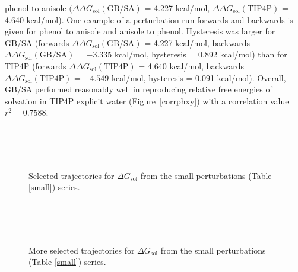 \documentclass[12pt]{report}
\def\figlab{Figure}\def\figslab{\figlab s}
\newcommand*\fig[1]{\figlab~\ref{#1}}
\begin{document}
phenol to anisole 
$(\Delta\Delta G_{ \textrm{sol}}(\textrm{GB/SA})$ = 4.227 kcal/mol, 
$\Delta\Delta G_{ \textrm{sol}}(\textrm{TIP4P})$ = 4.640 kcal/mol). 
One example of a perturbation run forwards and backwards is given for phenol to anisole and anisole to phenol. 
Hysteresis was larger for GB/SA (forwards 
$\Delta\Delta G_{ \textrm{sol}}(\textrm{GB/SA})$ = 4.227 kcal/mol, backwards 
$\Delta\Delta G_{ \textrm{sol}}(\textrm{GB/SA})$ = $-3.335$ kcal/mol, 
hysteresis = 0.892 kcal/mol) 
than for TIP4P (forwards 
$\Delta\Delta G_{ \textrm{sol}}(\textrm{TIP4P})$ = 4.640 kcal/mol, backwards 
$\Delta\Delta G_{ \textrm{sol}}(\textrm{TIP4P})$ = $-4.549$ kcal/mol, 
hysteresis = 0.091 kcal/mol). 
Overall, GB/SA performed reasonably well in reproducing relative free energies of solvation in TIP4P explicit water (\fig{corrphxy}) with a correlation value $r^{2} = 0.7588$. 

\begin{figure}[p]
\centering
\hspace*{-1.3cm}\\
\hspace*{-1.3cm}\\
\hspace*{-1.3cm}\\
\caption{Selected trajectories for $\Delta G_\textrm{sol}$ from the small perturbations (Table \ref{small}) series.}
\label{dgsolsm1}
\end{figure}

\begin{figure}[p]
\centering
\hspace*{-1.3cm}\\
\hspace*{-1.3cm}\\
\hspace*{-1.3cm}\\
\caption{More selected trajectories for $\Delta G_\textrm{sol}$ from the small perturbations (Table \ref{small}) series.}
\label{dgsolsm2}
\end{figure}
\end{document}
